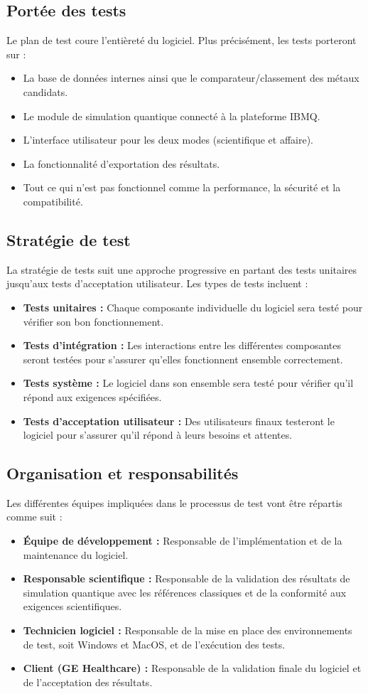 \documentclass[11pt]{article}
\begin{document}
\subsection{Portée des tests}
Le plan de test coure l'entièreté du logiciel. Plus précisément, les tests porteront sur :
\begin{itemize}
  \item La base de données internes ainsi que le comparateur/classement des métaux candidats.
  \item Le module de simulation quantique connecté à la plateforme IBMQ.
  \item L’interface utilisateur pour les deux modes (scientifique et affaire).
  \item La fonctionnalité d'exportation des résultats.
  \item Tout ce qui n'est pas fonctionnel comme la performance, la sécurité et la compatibilité.
\end{itemize}
\newpage
\subsection{Stratégie de test}
La stratégie de tests suit une approche progressive en partant des tests unitaires jusqu'aux tests d'acceptation utilisateur. Les types de tests incluent :
\begin{itemize}
  \item \textbf{Tests unitaires :} Chaque composante individuelle du logiciel sera testé pour vérifier son bon fonctionnement.
  \item \textbf{Tests d'intégration :} Les interactions entre les différentes composantes seront testées pour s'assurer qu'elles fonctionnent ensemble correctement.
  \item \textbf{Tests système :} Le logiciel dans son ensemble sera testé pour vérifier qu'il répond aux exigences spécifiées.
  \item \textbf{Tests d'acceptation utilisateur :} Des utilisateurs finaux testeront le logiciel pour s'assurer qu'il répond à leurs besoins et attentes.
\end{itemize}
\subsection{Organisation et responsabilités}
Les différentes équipes impliquées dans le processus de test vont être répartis comme suit :
\begin{itemize}
  \item \textbf{Équipe de développement :} Responsable de l'implémentation et de la maintenance du logiciel.
  \item \textbf{Responsable scientifique :} Responsable de la validation des résultats de simulation quantique avec les références classiques et de la conformité aux exigences scientifiques.
  \item \textbf{Technicien logiciel :} Responsable de la mise en place des environnements de test, soit Windows et MacOS, et de l'exécution des tests.
  \item \textbf{Client (GE Healthcare) :} Responsable de la validation finale du logiciel et de l'acceptation des résultats.
\end{itemize}
\end{document}
